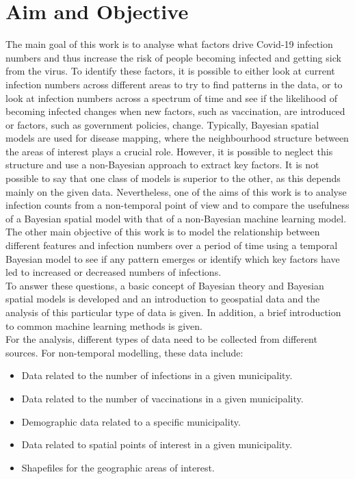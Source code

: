 \section{Aim and Objective}
The main goal of this work is to analyse what factors drive Covid-19 infection numbers and thus increase the risk of people becoming infected and getting sick from the virus. To identify these factors, it is possible to either look at current infection numbers across different areas to try to find patterns in the data, or to look at infection numbers across a spectrum of time and see if the likelihood of becoming infected changes when new factors, such as vaccination, are introduced or factors, such as government policies, change. Typically, Bayesian spatial models are used for disease mapping, where the neighbourhood structure between the areas of interest plays a crucial role. However, it is possible to neglect this structure and use a non-Bayesian approach to extract key factors. It is not possible to say that one class of models is superior to the other, as this depends mainly on the given data. Nevertheless, one of the aims of this work is to analyse infection counts from a non-temporal point of view and to compare the usefulness of a Bayesian spatial model with that of a non-Bayesian machine learning model. The other main objective of this work is to model the relationship between different features and infection numbers over a period of time using a temporal Bayesian model to see if any pattern emerges or identify which key factors have led to increased or decreased numbers of infections. \\
To answer these questions, a basic concept of Bayesian theory and Bayesian spatial models is developed and an introduction to geospatial data and the analysis of this particular type of data is given. In addition, a brief introduction to common machine learning methods is given. \\
For the analysis, different types of data need to be collected from different sources. For non-temporal modelling, these data include:
\begin{itemize}
    \item Data related to the number of infections in a given municipality.
    \item Data related to the number of vaccinations in a given municipality.
    \item Demographic data related to a specific municipality.
    \item Data related to spatial points of interest in a given municipality.
    \item Shapefiles for the geographic areas of interest.
\end{itemize}
